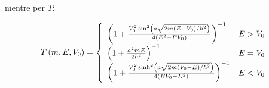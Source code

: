 mentre per $T$:

\begin{equation}
T\lrt{m,E,V_0} = \lr\{.{\begin{array}{lr}
	\lrt{1 +\frac{V_0^2\sin^2\lrt{a \sqrt{2m \lrt{E-V_0}/\hbar^2}}}{4\lrt{E^2 - EV_0}} }^{-1} & E>V_0 \\
	\lrt{1 + \frac{a^2 m E}{2\hbar^2}}^{-1}                                                   & E=V_0 \\
	\lrt{1 +\frac{V_0^2\sinh^2\lrt{a \sqrt{2m \lrt{V_0-E}/\hbar^2}}}{4\lrt{EV_0-E^2}} }^{-1}  & E<V_0
\end{array}}
\end{equation}
